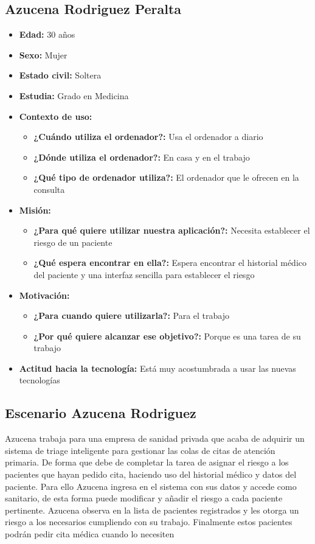 \subsection{Azucena Rodriguez Peralta}
\begin{itemize}
    \item \textbf{Edad: } 30 años
    \item \textbf{Sexo: } Mujer
    \item \textbf{Estado civil: } Soltera
    \item \textbf{Estudia: } Grado en Medicina
    \item \textbf{Contexto de uso: } 
    \begin{itemize}
        \item \textbf{¿Cuándo utiliza el ordenador?: }  Usa el ordenador a diario
        \item \textbf{¿Dónde utiliza el ordenador?: } En casa y en el trabajo 
        \item \textbf{¿Qué tipo de ordenador utiliza?: } El ordenador que le ofrecen en la consulta
    \end{itemize}
    \item \textbf{Misión: } 
    \begin{itemize}
        \item \textbf{¿Para qué quiere utilizar nuestra aplicación?: } Necesita establecer el riesgo de un paciente
        \item \textbf{¿Qué espera encontrar en ella?: } Espera encontrar el historial médico del paciente y una interfaz sencilla para establecer el riesgo
    \end{itemize}
    \item \textbf{Motivación: } 
    \begin{itemize}
        \item \textbf{¿Para cuando quiere utilizarla?: } Para el trabajo 
        \item \textbf{¿Por qué quiere alcanzar ese objetivo?: } Porque es una tarea de su trabajo
    \end{itemize}
    \item \textbf{Actitud hacia la tecnología: } Está muy acostumbrada a usar las nuevas tecnologías
\end{itemize}

\subsection{Escenario Azucena Rodriguez}
    Azucena trabaja para una empresa de sanidad privada que acaba de adquirir un sistema de triage 
    inteligente para gestionar las colas de citas de atención primaria. De forma que debe de completar
    la tarea de asignar el riesgo a los pacientes que hayan pedido cita, haciendo uso del historial médico
    y datos del paciente. Para ello Azucena ingresa en el sistema con sus datos y accede como sanitario, 
    de esta forma puede modificar y añadir el riesgo a cada paciente pertinente. Azucena observa en la lista
    de pacientes registrados y les otorga un riesgo a los necesarios cumpliendo con su trabajo. 
    Finalmente estos pacientes podrán pedir cita médica cuando lo necesiten